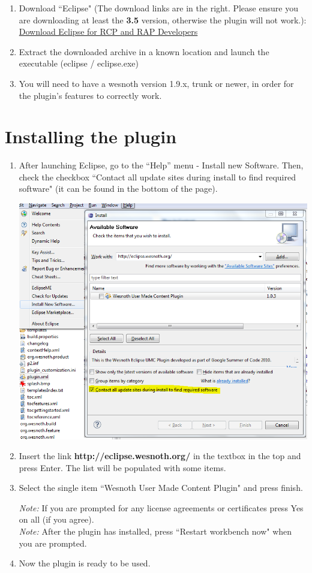\documentclass[10pt]{article}
\begin{document}
\begin{enumerate}
\item Download ``Eclipse" (The download links are in the right. Please ensure you are downloading at least the \textbf{3.5} version, otherwise the plugin will not work.):   \href{http://eclipse.org/downloads/packages/eclipse-rcp-and-rap-developers/heliosr}{Download Eclipse for RCP and RAP Developers}

\item Extract the downloaded archive in a known location and launch the executable (eclipse / eclipse.exe)

\item You will need to have a wesnoth version 1.9.x, trunk or newer, in order for the plugin's features to correctly work.
\end{enumerate}

\section{Installing the plugin}
\begin{enumerate}
\item After launching Eclipse, go to the ``Help'' menu - Install new Software. Then, check the checkbox ``Contact all update sites during install to find required software" (it can be found in the bottom of the page).

\begin{center}
\includegraphics[scale=0.7]{install_new_software.png}
\end{center}

\item Insert the link \textbf{http://eclipse.wesnoth.org/} in the textbox in the top and press Enter. The list will be populated with some items.
\item Select the single item ``Wesnoth User Made Content Plugin" and press finish.

\textit{Note:} If you are prompted for any license agreements or certificates press Yes on all (if you agree).\\
\textit{Note:} After the plugin has installed, press ``Restart workbench now" when you are prompted.
\item Now the plugin is ready to be used.
\end{enumerate}
\end{document}
